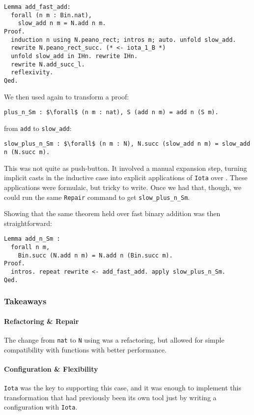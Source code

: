 \begin{lstlisting}
Lemma add_fast_add:
  forall (n m : Bin.nat),
    slow_add n m = N.add n m.
Proof.
  induction n using N.peano_rect; intros m; auto. unfold slow_add.
  rewrite N.peano_rect_succ. (* <- iota_1_B *)
  unfold slow_add in IHn. rewrite IHn.
  rewrite N.add_succ_l.
  reflexivity.
Qed.
\end{lstlisting}

We then used \toolname again to transform a proof:
\begin{lstlisting}
plus_n_Sm : $\forall$ (n m : nat), S (add n m) = add n (S m).
\end{lstlisting}
from \lstinline{add} to \lstinline{slow_add}:

\begin{lstlisting}
slow_plus_n_Sm : $\forall$ (n m : N), N.succ (slow_add n m) = slow_add n (N.succ m).
\end{lstlisting}
This was not quite as push-button.
It involved a manual expansion step, turning implicit casts in the inductive case
into explicit applications of \lstinline{Iota} over \A.
These applications were formulaic, but tricky to write.
Once we had that, though, we could run the same \lstinline{Repair} command
to get \lstinline{slow_plus_n_Sm}.

Showing that the same theorem held over fast binary addition was then
straightforward:

\begin{lstlisting}
Lemma add_n_Sm :
  forall n m,
    Bin.succ (N.add n m) = N.add n (Bin.succ m).
Proof.
  intros. repeat rewrite <- add_fast_add. apply slow_plus_n_Sm.
Qed.
\end{lstlisting}

\subsubsection{Takeaways}

\paragraph{Refactoring \& Repair}
The change from \lstinline{nat} to \lstinline{N} using \toolname was a refactoring,
but allowed for simple compatibility with functions with better performance.

\paragraph{Configuration \& Flexibility}
\lstinline{Iota} was the key to supporting this case,
and it was enough to implement this transformation that had previously been its own tool
just by writing a configuration with \lstinline{Iota}. 

